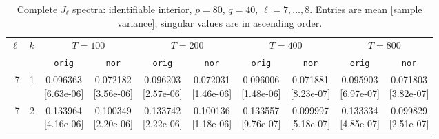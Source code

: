 \documentclass[12pt,letterpaper]{article}
\def\spacingset#1{\renewcommand{\baselinestretch}{#1}\small\normalsize}
\theoremstyle{plain}
\theoremstyle{definition}
\begin{document}
\clearpage
\begin{table}[p]
\begingroup
\spacingset{1.0}
\small\centering
\caption{Complete $J_\ell$ spectra: identifiable interior, $p=80$, $q=40$, $\ell=7,\ldots,8$. Entries are mean [sample variance]; singular values are in ascending order.}
\label{s23:lambda:alltab:spectra:p80q40interior:7-8}
\footnotesize
\setlength{\tabcolsep}{2.2pt}
\renewcommand{\arraystretch}{1.03}
\begin{adjustbox}{max width=\linewidth}
\begin{tabular}{@{}rr*{8}{c}@{}}
\toprule
$\ell$ & $k$ & \multicolumn{2}{c}{$T=100$} & \multicolumn{2}{c}{$T=200$} & \multicolumn{2}{c}{$T=400$} & \multicolumn{2}{c}{$T=800$}\\
\cmidrule(lr){3-4}\cmidrule(lr){5-6}\cmidrule(lr){7-8}\cmidrule(lr){9-10}
 &  & \texttt{orig} & \texttt{nor} & \texttt{orig} & \texttt{nor} & \texttt{orig} & \texttt{nor} & \texttt{orig} & \texttt{nor}\\
\midrule
7 & 1 & \shortstack{0.096363\\[-1pt]{\scriptsize[6.63e-06]}} & \shortstack{0.072182\\[-1pt]{\scriptsize[3.56e-06]}} & \shortstack{0.096203\\[-1pt]{\scriptsize[2.57e-06]}} & \shortstack{0.072031\\[-1pt]{\scriptsize[1.46e-06]}} & \shortstack{0.096006\\[-1pt]{\scriptsize[1.48e-06]}} & \shortstack{0.071881\\[-1pt]{\scriptsize[8.23e-07]}} & \shortstack{0.095903\\[-1pt]{\scriptsize[6.97e-07]}} & \shortstack{0.071803\\[-1pt]{\scriptsize[3.82e-07]}}\\
7 & 2 & \shortstack{0.133964\\[-1pt]{\scriptsize[4.16e-06]}} & \shortstack{0.100349\\[-1pt]{\scriptsize[2.20e-06]}} & \shortstack{0.133742\\[-1pt]{\scriptsize[2.22e-06]}} & \shortstack{0.100136\\[-1pt]{\scriptsize[1.18e-06]}} & \shortstack{0.133557\\[-1pt]{\scriptsize[9.76e-07]}} & \shortstack{0.099997\\[-1pt]{\scriptsize[5.18e-07]}} & \shortstack{0.133334\\[-1pt]{\scriptsize[4.85e-07]}} & \shortstack{0.099829\\[-1pt]{\scriptsize[2.51e-07]}}\\

\end{tabular}
\end{adjustbox}
\end{table}
\end{document}
